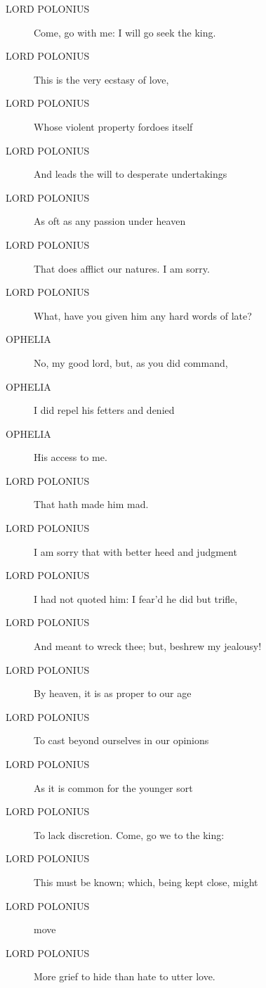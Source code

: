 \documentclass{article}
\begin{document}
\begin{description}
            
\item[LORD POLONIUS] Come, go with me: I will go seek the king.
\item[LORD POLONIUS] This is the very ecstasy of love,
\item[LORD POLONIUS] Whose violent property fordoes itself
\item[LORD POLONIUS] And leads the will to desperate undertakings
\item[LORD POLONIUS] As oft as any passion under heaven
\item[LORD POLONIUS] That does afflict our natures. I am sorry.
\item[LORD POLONIUS] What, have you given him any hard words of late?
\end{description}
          
\begin{description}
            
\item[OPHELIA] No, my good lord, but, as you did command,
\item[OPHELIA] I did repel his fetters and denied
\item[OPHELIA] His access to me.
\end{description}
          
\begin{description}
            
\item[LORD POLONIUS] That hath made him mad.
\item[LORD POLONIUS] I am sorry that with better heed and judgment
\item[LORD POLONIUS] I had not quoted him: I fear'd he did but trifle,
\item[LORD POLONIUS] And meant to wreck thee; but, beshrew my jealousy!
\item[LORD POLONIUS] By heaven, it is as proper to our age
\item[LORD POLONIUS] To cast beyond ourselves in our opinions
\item[LORD POLONIUS] As it is common for the younger sort
\item[LORD POLONIUS] To lack discretion. Come, go we to the king:
\item[LORD POLONIUS] This must be known; which, being kept close, might
\item[LORD POLONIUS] move
\item[LORD POLONIUS] More grief to hide than hate to utter love.
\end{description}
          
\end{document}
